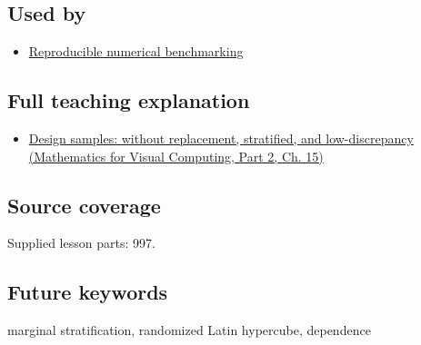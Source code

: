 \subsection{Used by}\label{appendix-1c5e85693a06-used-by}

\hypertarget{appendix-1c5e85693a06-used-by}{}

\begin{itemize}
\tightlist
\item
  \hyperref[appendix-b9db93e28371]{Reproducible numerical benchmarking}
\end{itemize}

\subsection{Full teaching explanation}\label{appendix-1c5e85693a06-full-teaching-explanation}

\hypertarget{appendix-1c5e85693a06-full-teaching-explanation}{}

\begin{itemize}
\tightlist
\item
  \href{../02-Mathematics-for-Visual-Computing-P02/main.pdf\#nameddest=02-foundations-ii-ch031-design-samples-without-replacement-stratified-and-low-discrepancy}{Design samples: without replacement, stratified, and low-discrepancy (Mathematics for Visual Computing, Part 2, Ch. 15)}
\end{itemize}

\subsection{Source coverage}\label{appendix-1c5e85693a06-source-coverage}

\hypertarget{appendix-1c5e85693a06-source-coverage}{}

Supplied lesson parts: 997.

\subsection{Future keywords}\label{appendix-1c5e85693a06-future-keywords}

\hypertarget{appendix-1c5e85693a06-future-keywords}{}

marginal stratification, randomized Latin hypercube, dependence
